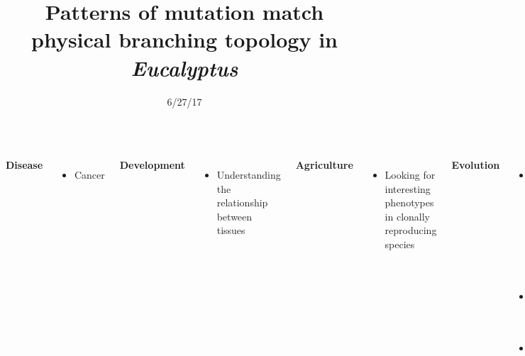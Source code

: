 \documentclass{beamer}
\title[Eucalyptus Mutation Topology]{Patterns of mutation match physical branching topology in \textit{Eucalyptus}}
\date{6/27/17}
\author{Adam Orr\hskip 1em \faicon{twitter}@AdamJOrr}
\begin{document}
\frame{\titlepage}


\begin{frame}
\begin{columns}

\textbf{Disease}
\begin{itemize}
\item Cancer
\end{itemize}

\vfill

\textbf{Development}
\begin{itemize}
\item Understanding the relationship between tissues
\end{itemize}

\vfill

\textbf{Agriculture}
\begin{itemize}
\item Looking for interesting phenotypes in clonally reproducing species
\end{itemize}


\textbf{Evolution}
\begin{itemize}
\item Determining the relationship between somatic and germline mutation rate
\item Evolution of mutator phenotypes
\item Mutational stress response
\end{itemize}

\end{columns}
\end{frame}
\end{document}
